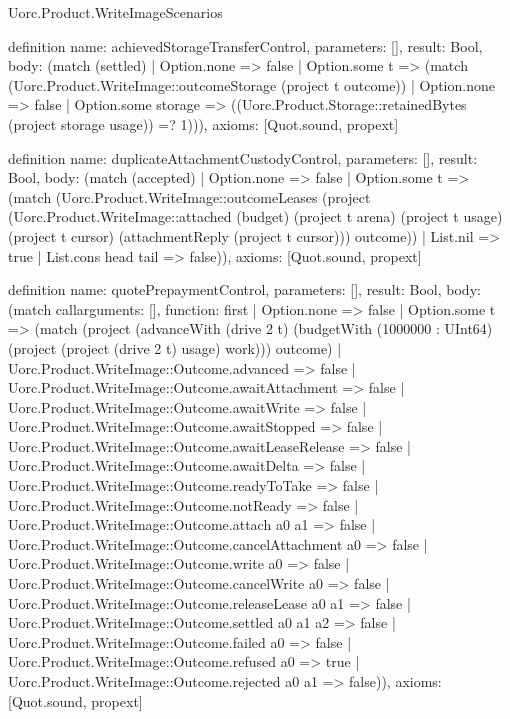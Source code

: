 \begin{lexlean}{Uorc.Product.WriteImageScenarios}
\begin{semanticmodule}
definition{
  name: achievedStorageTransferControl,
  parameters: [],
  result: Bool,
  body: (match (settled)
    | Option.none => false
    | Option.some t => (match (Uorc.Product.WriteImage::outcomeStorage (project t outcome))
      | Option.none => false
      | Option.some storage => ((Uorc.Product.Storage::retainedBytes (project storage usage)) =? 1))),
  axioms: [Quot.sound, propext]
}

definition{
  name: duplicateAttachmentCustodyControl,
  parameters: [],
  result: Bool,
  body: (match (accepted)
    | Option.none => false
    | Option.some t => (match (Uorc.Product.WriteImage::outcomeLeases (project (Uorc.Product.WriteImage::attached (budget) (project t arena) (project t usage) (project t cursor) (attachmentReply (project t cursor))) outcome))
      | List.nil => true
      | List.cons head tail => false)),
  axioms: [Quot.sound, propext]
}

definition{
  name: quotePrepaymentControl,
  parameters: [],
  result: Bool,
  body: (match call{arguments: [], function: first}
    | Option.none => false
    | Option.some t => (match (project (advanceWith (drive 2 t) (budgetWith (1000000 : UInt64) (project (project (drive 2 t) usage) work))) outcome)
      | Uorc.Product.WriteImage::Outcome.advanced => false
      | Uorc.Product.WriteImage::Outcome.awaitAttachment => false
      | Uorc.Product.WriteImage::Outcome.awaitWrite => false
      | Uorc.Product.WriteImage::Outcome.awaitStopped => false
      | Uorc.Product.WriteImage::Outcome.awaitLeaseRelease => false
      | Uorc.Product.WriteImage::Outcome.awaitDelta => false
      | Uorc.Product.WriteImage::Outcome.readyToTake => false
      | Uorc.Product.WriteImage::Outcome.notReady => false
      | Uorc.Product.WriteImage::Outcome.attach a0 a1 => false
      | Uorc.Product.WriteImage::Outcome.cancelAttachment a0 => false
      | Uorc.Product.WriteImage::Outcome.write a0 => false
      | Uorc.Product.WriteImage::Outcome.cancelWrite a0 => false
      | Uorc.Product.WriteImage::Outcome.releaseLease a0 a1 => false
      | Uorc.Product.WriteImage::Outcome.settled a0 a1 a2 => false
      | Uorc.Product.WriteImage::Outcome.failed a0 => false
      | Uorc.Product.WriteImage::Outcome.refused a0 => true
      | Uorc.Product.WriteImage::Outcome.rejected a0 a1 => false)),
  axioms: [Quot.sound, propext]
}


\end{semanticmodule}
\end{lexlean}
